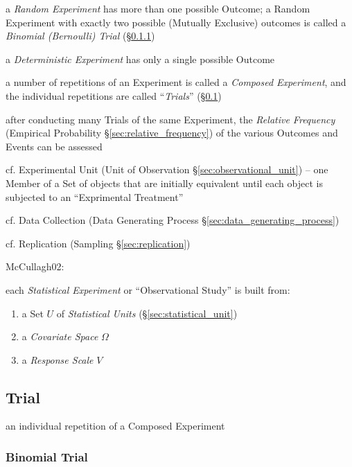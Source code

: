 a \emph{Random Experiment} has more than one possible Outcome; a Random
Experiment with exactly two possible (Mutually Exclusive) outcomes is called a
\emph{Binomial (Bernoulli) Trial} (\S\ref{sec:binomial_trial})

a \emph{Deterministic Experiment} has only a single possible Outcome

a number of repetitions of an Experiment is called a \emph{Composed Experiment},
and the individual repetitions are called ``\emph{Trials}'' (\S\ref{sec:trial})

after conducting many Trials of the same Experiment, the \emph{Relative
  Frequency} (Empirical Probability \S\ref{sec:relative_frequency}) of the
various Outcomes and Events can be assessed

\fist cf. Experimental Unit (Unit of Observation \S\ref{sec:observational_unit})
-- one Member of a Set of objects that are initially equivalent until each
object is subjected to an ``Exprimental Treatment''

\fist cf. Data Collection (Data Generating Process
\S\ref{sec:data_generating_process})

\fist cf. Replication (Sampling \S\ref{sec:replication})

\asterism


McCullagh02:

each \emph{Statistical Experiment} or ``Observational Study'' is built from:
\begin{enumerate}
  \item a Set $U$ of \emph{Statistical Units} (\S\ref{sec:statistical_unit})
  \item a \emph{Covariate Space} $\Omega$
  \item a \emph{Response Scale} $V$
\end{enumerate}



\subsection{Trial}\label{sec:trial}

an individual repetition of a Composed Experiment



\subsubsection{Binomial Trial}\label{sec:binomial_trial}

